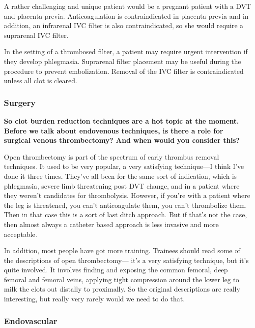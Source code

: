 \documentclass[
]{book}
\begin{document}
A rather challenging and unique patient would be a pregnant patient with
a DVT and placenta previa. Anticoagulation is contraindicated in
placenta previa and in addition, an infrarenal IVC filter is also
contraindicated, so she would require a suprarenal IVC
filter.\citep{bates2018, deyoung2016, harris2016}

In the setting of a thrombosed filter, a patient may require urgent
intervention if they develop phlegmasia. Suprarenal filter placement may
be useful during the procedure to prevent embolization. Removal of the
IVC filter is contraindicated unless all clot is cleared.\citep{sheth2015, teter2019}

\hypertarget{surgery-1}{%
\subsubsection{Surgery}\label{surgery-1}}

\textbf{So clot burden reduction techniques are a hot topic at the moment.
Before we talk about endovenous techniques, is there a role for surgical
venous thrombectomy? And when would you consider this?}

Open thrombectomy is part of the spectrum of early thrombus removal
techniques. It used to be very popular, a very satisfying technique---I
think I've done it three times. They've all been for the same sort of
indication, which is phlegmasia, severe limb threatening post DVT
change, and in a patient where they weren't candidates for thrombolysis.
However, if you're with a patient where the leg is threatened, you can't
anticoagulate them, you can't thrombolize them. Then in that case this
is a sort of last ditch approach. But if that's not the case, then
almost always a catheter based approach is less invasive and more
acceptable.

In addition, most people have got more training. Trainees should read
some of the descriptions of open thrombectomy--- it's a very satisfying
technique, but it's quite involved. It involves finding and exposing the
common femoral, deep femoral and femoral veins, applying tight
compression around the lower leg to milk the clots out distally to
proximally. So the original descriptions are really interesting, but
really very rarely would we need to do that.\citep{comerota2019}

\hypertarget{endovascular}{%
\subsubsection{Endovascular}\label{endovascular}}
\end{document}
